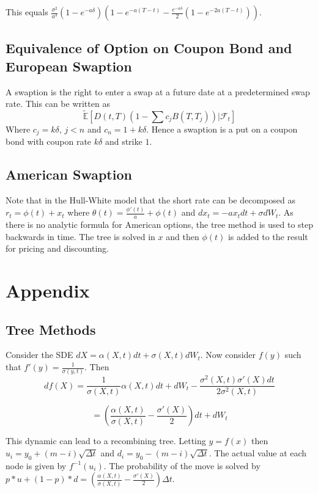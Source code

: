 \documentclass{article}
\theoremstyle{definition}
\begin{document}
This equals \(\frac{\sigma^2}{a^3}\left(1-e^{-a\delta}\right)\left(1-e^{-a(T-t)}-\frac{e^{-a\delta}}{2}\left(1-e^{-2a(T-t)}\right)\right)\).

 \subsection{Equivalence of Option on Coupon Bond and European Swaption}
 
 A swaption is the right to enter a swap at a future date at a predetermined swap rate.  This can be written as
 \[\mathbb{\tilde{E}} \left[D(t, T)\left(1-\sum c_j B(T, T_j) \right) | \mathcal{F}_t \right]\]
 Where \(c_j=k\delta,\,j<n\) and \(c_n=1+k\delta\).  Hence a swaption is a put on a coupon bond with coupon rate \(k\delta\) and strike \(1\).  
 
\subsection{American Swaption}

Note that in the Hull-White model that the short rate can be decomposed as \(r_t=\phi(t)+x_t\) where \(\theta(t)=\frac{\phi'(t)}{a}+\phi(t)\) and \(dx_t=-ax_t dt+\sigma dW_t\).  As there is no analytic formula for American options, the tree method is used to step backwards in time.  The tree is solved in \(x\) and then \(\phi(t)\) is added to the result for pricing and discounting.  

\section{Appendix}

\subsection{Tree Methods} \label{tree}
Consider the SDE \(dX=\alpha(X, t)dt+\sigma(X, t)dW_t\).  Now consider \(f(y)\) such that \(f'(y)=\frac{1}{\sigma(y, t)}\).  Then \[df(X)=\frac{1}{\sigma(X, t)} \alpha(X, t)dt+dW_t-\frac{\sigma^2(X, t)\sigma'(X)dt}{2\sigma^2(X, t)}\]

\[=\left(\frac{\alpha(X, t)}{\sigma(X, t)}-\frac{\sigma'(X)}{2}\right)dt+dW_t\]
 
 This dynamic can lead to a recombining tree.  Letting \(y=f(x)\) then \(u_i=y_0+(m-i)\sqrt{\Delta t}\) and \(d_i=y_0-(m-i)\sqrt{\Delta t}\).  The actual value at each node is given by \(f^{-1}(u_i)\). The probability of the move is solved by \(p*u+(1-p)*d=\left(\frac{\alpha(X, t)}{\sigma(X, t)}-\frac{\sigma'(X)}{2}\right)\Delta t\). 
 
\end{document}
